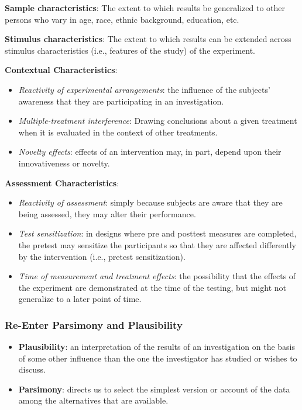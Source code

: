 \documentclass[
  english,
]{book}
\providecommand{\tightlist}{%
  \setlength{\itemsep}{0pt}\setlength{\parskip}{0pt}}
\begin{document}
\textbf{Sample characteristics}: The extent to which results be generalized to other persons who vary in age, race, ethnic background, education, etc.

\textbf{Stimulus characteristics}: The extent to which results can be extended across stimulus characteristics (i.e., features of the study) of the experiment.

\textbf{Contextual Characteristics}:

\begin{itemize}
\tightlist
\item
  \emph{Reactivity of experimental arrangements}: the influence of the subjects' awareness that they are participating in an investigation.
\item
  \emph{Multiple-treatment interference}: Drawing conclusions about a given treatment when it is evaluated in the context of other treatments.
\item
  \emph{Novelty effects}: effects of an intervention may, in part, depend upon their innovativeness or novelty.
\end{itemize}

\textbf{Assessment Characteristics}:

\begin{itemize}
\tightlist
\item
  \emph{Reactivity of assessment}: simply because subjects are aware that they are being assessed, they may alter their performance.
\item
  \emph{Test sensitization}: in designs where pre and posttest measures are completed, the pretest may sensitize the participants so that they are affected differently by the intervention (i.e., pretest sensitization).
\item
  \emph{Time of measurement and treatment effects}: the possibility that the effects of the experiment are demonstrated at the time of the testing, but might not generalize to a later point of time.
\end{itemize}

\hypertarget{re-enter-parsimony-and-plausibility}{%
\subsubsection{Re-Enter Parsimony and Plausibility}\label{re-enter-parsimony-and-plausibility}}

\begin{itemize}
\tightlist
\item
  \textbf{Plausibility}: an interpretation of the results of an investigation on the basis of some other influence than the one the investigator has studied or wishes to discuss.
\item
  \textbf{Parsimony}: directs us to select the simplest version or account of the data among the alternatives that are available.
\end{itemize}
\end{document}
